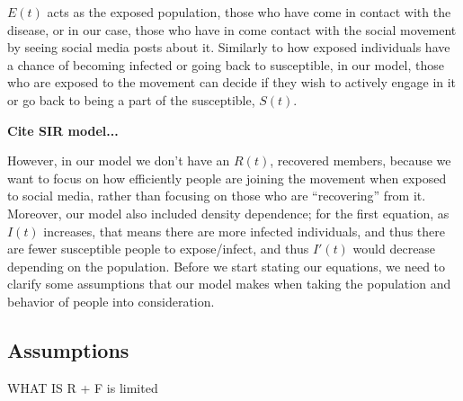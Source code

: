 \documentclass{article}
\begin{document}
    
    $E(t)$ acts as the exposed population, those who have come in contact with the disease, or in our case, those who have in come contact with the social movement by seeing social media posts about it. Similarly to how exposed individuals have a chance of becoming infected or going back to susceptible, in our model, those who are exposed to the movement can decide if they wish to actively engage in it or go back to being a part of the susceptible, $S(t)$.
    
    \textbf{Cite SIR model...} 
    
    
    
    
    However, in our model we don’t have an $R(t)$, recovered members, because we want to focus on how efficiently people are joining the movement when exposed to social media, rather than focusing on those who are “recovering” from it. Moreover, our model also included density dependence; for the first equation, as $I(t)$ increases, that means there are more infected individuals, and thus there are fewer susceptible people to expose/infect, and thus $I'(t)$ would decrease depending on the population.
    Before we start stating our equations, we need to clarify some assumptions that our model makes when taking the population and behavior of people into consideration.

    \subsection{Assumptions}
    WHAT IS R + F is limited
    
\end{document}
